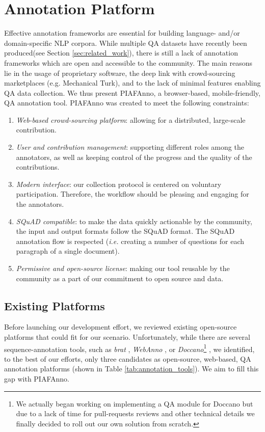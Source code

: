 \documentclass[10pt, a4paper]{article}
\begin{document}
\section{Annotation Platform}
Effective annotation frameworks are essential  for  building  language- and/or domain-specific NLP corpora. 
While multiple QA datasets have recently been produced(see Section \ref{sec:related_work}), there is still a lack of annotation frameworks which are open and accessible to the community.
The main reasons lie in the usage of proprietary software, the deep link with crowd-sourcing marketplaces (e.g. Mechanical Turk), and to the lack of minimal features enabling QA data collection. 
We thus present PIAFAnno, a browser-based, mobile-friendly, QA annotation tool. 
PIAFAnno was created to meet the following constraints:
\begin{enumerate}
\item \textit{Web-based crowd-sourcing platform}: allowing for a distributed, large-scale contribution.
\item \textit{User and contribution management}: supporting different roles among the annotators, as well as keeping control of the progress and the quality of the contributions.
\item \textit{Modern interface}: our collection protocol is centered on voluntary participation. Therefore, the workflow should be pleasing and engaging for the annotators.
\item \textit{SQuAD compatible}: to make the data quickly actionable by the community, the input and output formats follow the SQuAD format. The SQuAD annotation flow is respected (\emph{i.e.} creating a number of questions for each paragraph of a single document).
\item \textit{Permissive and open-source license}: making our tool reusable by the community as a part of our commitment to open source and data.
\end{enumerate}

\subsection{Existing Platforms}
Before launching our development effort, we reviewed existing open-source platforms that could fit for our scenario.
Unfortunately, while there are several sequence-annotation tools, such as \textit{brat} \cite{stenertop2012brat}, \textit{WebAnno} \cite{muhie2013webanno}, or \textit{Doccano}\footnote{We actually began working on implementing a QA module for Doccano but due to a lack of time for pull-requests reviews and other technical details we finally decided to roll out our own solution from scratch.} \cite{nakayama2018doccano},  we identified, to the best of our efforts, only three candidates as open-source, web-based, QA annotation platforms (shown in Table \ref{tab:annotation_tools}). We aim to fill this gap with PIAFAnno.
\end{document}
